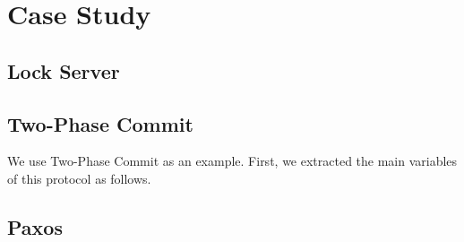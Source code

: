 
\section{Case Study}  \label{section:case-study}

\subsection{Lock Server} \label{ss:lock-server}

\subsection{Two-Phase Commit} \label{ss:2pc}
\item We use Two-Phase Commit as an example. First, we extracted the main variables of this protocol as follows.

\subsection{Paxos} \label{ss:paxos}

